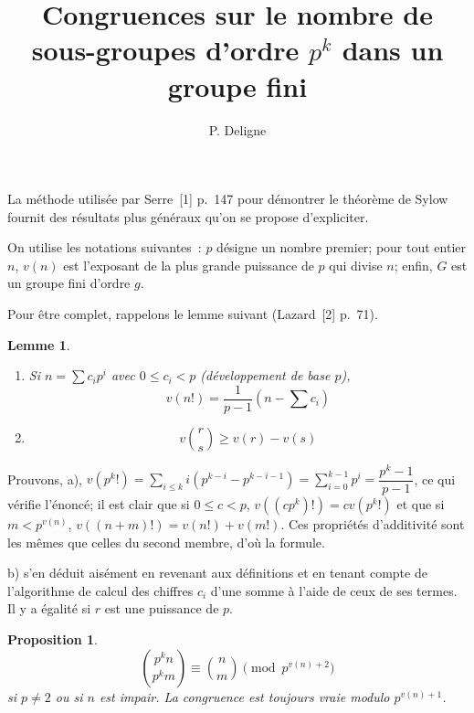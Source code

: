 \documentclass[12pt]{amsart}
\title{Congruences sur le nombre de sous-groupes d'ordre $p^k$ dans un groupe fini}
\author{P. Deligne}
\date{}
\theoremstyle{plain}
\newtheorem{lemme}{Lemme}
\newtheorem{proposition}{Proposition}
\begin{document}
\maketitle
\thispagestyle{empty}

La méthode utilisée par Serre~[1] p.~147 pour démontrer le théorème de Sylow fournit des résultats plus généraux qu'on se propose d'expliciter.

On utilise les notations suivantes~: $p$ désigne un nombre premier; pour tout entier $n$, $v(n)$ est l'exposant de la plus grande puissance de $p$ qui divise $n$; enfin, $G$ est un groupe fini d'ordre $g$.

Pour être complet, rappelons le lemme suivant (Lazard~[2] p.~71).

\begin{lemme}\ \par
\begin{enumerate}
\item[a)] Si $n = \sum c_i p^i$ avec $0 \leqslant c_i < p$ (développement de base $p$),
\[
v(n!) = \frac{1}{p-1}(n - \textstyle\sum c_i)
\]
\item[b)]
\[
v\binom{r}{s} \geqslant v(r) - v(s)
\]
\end{enumerate}
\end{lemme}

Prouvons, a), $v(p^k!) = \sum_{i \leqslant k} i(p^{k-i} - p^{k-i-1}) = \sum_{i=0}^{k-1} p^i = \dfrac{p^k-1}{p-1}$, ce qui vérifie l'énoncé; il est clair que si $0 \leqslant c < p$, $v((cp^k)!) = cv(p^k!)$ et que si $m < p^{v(n)}$, $v((n+m)!) = v(n!) + v(m!)$. Ces propriétés d'additivité sont les mêmes que celles du second membre, d'où la formule.

b) s'en déduit aisément en revenant aux définitions et en tenant compte de l'algorithme de calcul des chiffres $c_i$ d'une somme à l'aide de ceux de ses termes. Il y a égalité si $r$ est une puissance de $p$.

\begin{proposition}
\[
\binom{p^k n}{p^k m} \equiv \binom{n}{m} \pmod{p^{v(n)+2}}
\]
si $p \neq 2$ ou si $n$ est impair. La congruence est toujours vraie modulo $p^{v(n)+1}$.
\end{proposition}
\end{document}
